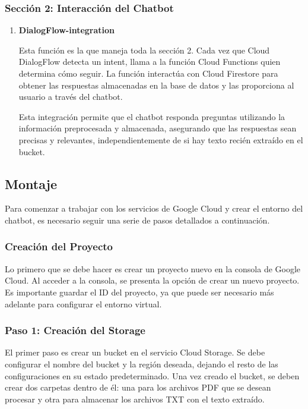 \subsubsection{Sección 2: Interacción del Chatbot}

\begin{enumerate}[7.]
    \item \textbf{DialogFlow-integration}
    
    Esta función es la que maneja toda la sección 2. Cada vez que Cloud DialogFlow detecta un intent, llama a la función Cloud Functions quien determina cómo seguir. La función interactúa con Cloud Firestore para obtener las respuestas almacenadas en la base de datos y las proporciona al usuario a través del chatbot. 

    Esta integración permite que el chatbot responda preguntas utilizando la información preprocesada y almacenada, asegurando que las respuestas sean precisas y relevantes, independientemente de si hay texto recién extraído en el bucket.

\end{enumerate}

\subsection{Montaje}\label{montaje-gcp}

Para comenzar a trabajar con los servicios de Google Cloud y crear el entorno del chatbot, es necesario seguir una serie de pasos detallados a continuación.

\subsubsection{Creación del Proyecto}
Lo primero que se debe hacer es crear un proyecto nuevo en la consola de Google Cloud. Al acceder a la consola, se presenta la opción de crear un nuevo proyecto. Es importante guardar el ID del proyecto, ya que puede ser necesario más adelante para configurar el entorno virtual.

\subsubsection{Paso 1: Creación del Storage}
El primer paso es crear un bucket en el servicio Cloud Storage. Se debe configurar el nombre del bucket y la región deseada, dejando el resto de las configuraciones en su estado predeterminado. Una vez creado el bucket, se deben crear dos carpetas dentro de él: una para los archivos PDF que se desean procesar y otra para almacenar los archivos TXT con el texto extraído.

